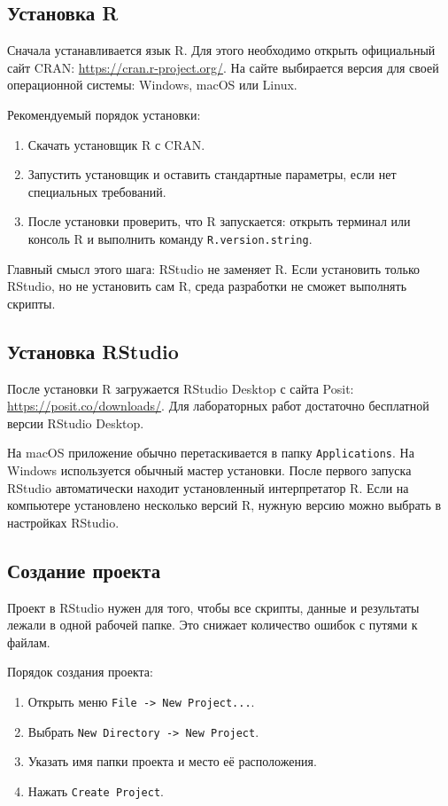 \documentclass[14pt,a4paper]{extarticle}
\begin{document}
\subsection{Установка R}

Сначала устанавливается язык R. Для этого необходимо открыть официальный сайт CRAN: \url{https://cran.r-project.org/}. На сайте выбирается версия для своей операционной системы: Windows, macOS или Linux.

Рекомендуемый порядок установки:

\begin{enumerate}[nosep]
  \item Скачать установщик R с CRAN.
  \item Запустить установщик и оставить стандартные параметры, если нет специальных требований.
  \item После установки проверить, что R запускается: открыть терминал или консоль R и выполнить команду \texttt{R.version.string}.
\end{enumerate}

Главный смысл этого шага: RStudio не заменяет R. Если установить только RStudio, но не установить сам R, среда разработки не сможет выполнять скрипты.

\subsection{Установка RStudio}

После установки R загружается RStudio Desktop с сайта Posit: \url{https://posit.co/downloads/}. Для лабораторных работ достаточно бесплатной версии RStudio Desktop.

На macOS приложение обычно перетаскивается в папку \texttt{Applications}. На Windows используется обычный мастер установки. После первого запуска RStudio автоматически находит установленный интерпретатор R. Если на компьютере установлено несколько версий R, нужную версию можно выбрать в настройках RStudio.

\subsection{Создание проекта}

Проект в RStudio нужен для того, чтобы все скрипты, данные и результаты лежали в одной рабочей папке. Это снижает количество ошибок с путями к файлам.

Порядок создания проекта:

\begin{enumerate}[nosep]
  \item Открыть меню \texttt{File -> New Project...}.
  \item Выбрать \texttt{New Directory -> New Project}.
  \item Указать имя папки проекта и место её расположения.
  \item Нажать \texttt{Create Project}.
\end{enumerate}
\end{document}
